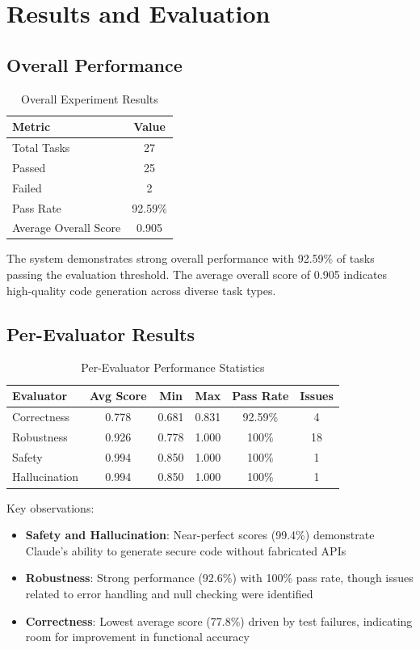 \documentclass[12pt,a4paper]{article}
\begin{document}
\section{Results and Evaluation}

\subsection{Overall Performance}

\begin{table}[H]
\centering
\caption{Overall Experiment Results}
\begin{tabular}{lc}
\toprule
\textbf{Metric} & \textbf{Value} \\
\midrule
Total Tasks & 27 \\
Passed & 25 \\
Failed & 2 \\
Pass Rate & 92.59\% \\
Average Overall Score & 0.905 \\
\bottomrule
\end{tabular}
\label{tab:overall}
\end{table}

The system demonstrates strong overall performance with 92.59\% of tasks passing the evaluation threshold. The average overall score of 0.905 indicates high-quality code generation across diverse task types.

\subsection{Per-Evaluator Results}

\begin{table}[H]
\centering
\caption{Per-Evaluator Performance Statistics}
\begin{tabular}{lccccc}
\toprule
\textbf{Evaluator} & \textbf{Avg Score} & \textbf{Min} & \textbf{Max} & \textbf{Pass Rate} & \textbf{Issues} \\
\midrule
Correctness & 0.778 & 0.681 & 0.831 & 92.59\% & 4 \\
Robustness & 0.926 & 0.778 & 1.000 & 100\% & 18 \\
Safety & 0.994 & 0.850 & 1.000 & 100\% & 1 \\
Hallucination & 0.994 & 0.850 & 1.000 & 100\% & 1 \\
\bottomrule
\end{tabular}
\label{tab:evaluator_stats}
\end{table}

Key observations:
\begin{itemize}
    \item \textbf{Safety and Hallucination}: Near-perfect scores (99.4\%) demonstrate Claude's ability to generate secure code without fabricated APIs
    \item \textbf{Robustness}: Strong performance (92.6\%) with 100\% pass rate, though issues related to error handling and null checking were identified
    \item \textbf{Correctness}: Lowest average score (77.8\%) driven by test failures, indicating room for improvement in functional accuracy
\end{itemize}
\end{document}

